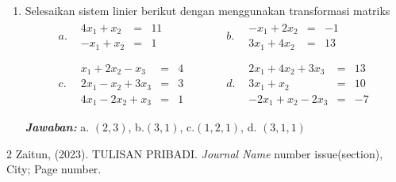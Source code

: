 \documentclass{article}   %
\begin{document}
\begin{enumerate}
$$\begin{array}{llllllllll}
\begin{array}{rrr}
				-2 &1 & -2 
			\end{array} 
			\right]
			\\
		\end{array} 
		$$
		\item Selesaikan sistem linier berikut dengan menggunakan transformasi matriks\\ %
				$$
		\begin{array}{lclc} 
			a. & 
			\begin{array}{rcr} 
				4x_1 + x_2&=& 11 \\
				-x_1 + x_2&=& 1 
			\end{array} ~~~~~~~~~~~~
			& b. & 
			\begin{array}{rcr} 
				-x_1 + 2x_2&=& -1 \\
				3x_1 + 4x_2&=& 13 
			\end{array} \\
		\\
			c. & \begin{array}{rcr} 
				x_1 + 2x_2  - x_3 &=& 4 \\
				2x_1 - x_2  + 3x_3 &=& 3  \\
				4x_1 - 2x_2  + x_3 &=& 1 
			\end{array} ~~~~~~~~~~~~
			& d. &  \begin{array}{lcr} 
				2x_1 + 4x_2  + 3x_3 &=& 13 \\
				3x_1 + x_2  &=& 10  \\
				-2x_1 + x_2  - 2x_3 &=& -7 
			\end{array}\\
			\\
		\end{array}
		$$
		\textbf{\textit{Jawaban:}} a. $(2,3)$, b.$(3,1)$, c.$(1,2,1)$, d. $(3,1,1)$
		\end{enumerate}
	
		\begin{thebibliography}{2}
			\bibitem{}Zaitun,										   %
			\newblock  (2023).										 %
			\newblock TULISAN PRIBADI.			    %
			\newblock \emph{Journal Name} number issue(section),    %
			\newblock City;											   %
			\newblock Page number.								  %
		\end{thebibliography}
	
\end{document}
